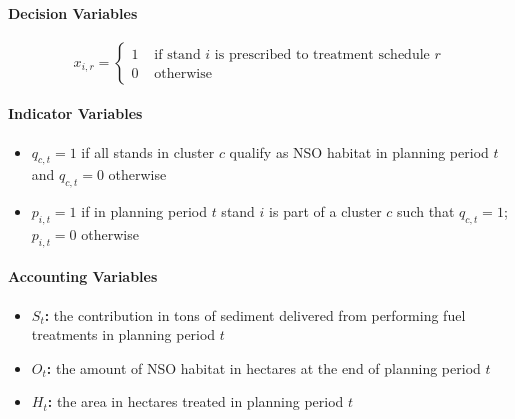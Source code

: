 \paragraph{Decision Variables}
$$
x_{i,r} = \begin{cases}
1 &\text{ if stand $i$ is prescribed to treatment schedule $r$}\\
0 &\text{ otherwise}
\end{cases}
$$ 

\paragraph{Indicator Variables}
\begin{itemize}
\item \textbf{$q_{c,t} = 1$} if all stands in cluster $c$ qualify as NSO habitat in planning period $t$ and $q_{c,t} = 0$ otherwise
\item \textbf{$p_{i,t} = 1$} if in planning period $t$ stand $i$ is part of a cluster $c$ such that $q_{c,t} = 1$; $p_{i,t} = 0$ otherwise
\end{itemize}

\paragraph{Accounting Variables}
\begin{itemize}
\item \textbf{$S_t$:} the contribution in tons of sediment delivered from performing fuel treatments in planning period $t$
\item \textbf{$O_t$:} the amount of NSO habitat in hectares at the end of planning period $t$
\item \textbf{$H_t$:} the area in hectares treated in planning period $t$
\end{itemize}

